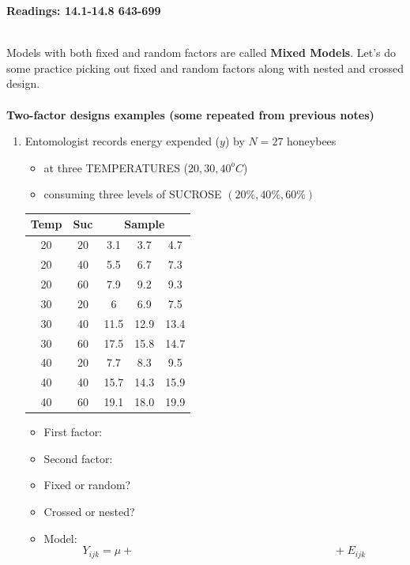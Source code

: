 \begin{center}\large\textbf{Readings: 14.1-14.8 643-699}\\
\normalsize \end{center}
\large \hlinewd{2pt}
~\\

Models with both fixed and random factors are called \textbf{Mixed Models}.  Let's do some practice picking out fixed and random factors along with nested and crossed design.\\~\\

\textbf{Two-factor designs examples (some repeated from previous notes)}
\begin{enumerate}
\item Entomologist records energy expended ($y$) by $N=27$ honeybees
\begin{itemize}
\item at three TEMPERATURES ($20,30,40^o C$)
\item consuming three levels of SUCROSE $(20\%,40\%,60\%)$ 
\end{itemize}
 
\begin{large}
\begin{center}
\begin{tabular}{|cc|ccc|}  \hline
Temp & Suc & \multicolumn{3}{c|}{Sample} \\ \hline
   20 & 20 & 3.1 & 3.7 & 4.7 \\
   20 & 40 & 5.5 & 6.7 & 7.3 \\
   20 & 60 & 7.9 & 9.2 & 9.3 \\
   30 & 20 & 6 & 6.9 & 7.5 \\
   30 & 40 & 11.5 & 12.9 & 13.4 \\
   30 & 60 & 17.5 & 15.8 & 14.7 \\
   40 & 20 & 7.7 & 8.3 & 9.5 \\
   40 & 40 & 15.7 & 14.3 & 15.9 \\
   40 & 60 & 19.1 & 18.0 & 19.9 \\ \hline
\end{tabular}
\end{center}
\end{large}

\begin{itemize}
\item First factor:
\item Second factor:
\item Fixed or random?
\item Crossed or nested?
\item Model:  
$$Y_{ijk} = \mu + \hspace{3in} + E_{ijk}$$
\end{itemize}



\end{enumerate}
